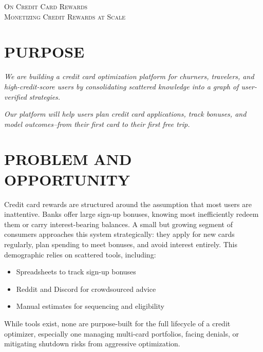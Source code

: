\begin{center}
    \textsc{\huge On Credit Card Rewards}\\[0.1cm]
    \textsc{Monetizing Credit Rewards at Scale}\\[1em]
\end{center}

\section{PURPOSE}
\textit{We are building a credit card optimization platform for churners, travelers, and high-credit-score users by consolidating scattered knowledge into a graph of user-verified strategies.}

\textit{Our platform will help users plan credit card applications, track bonuses, and model outcomes--from their first card to their first free trip.}

\vspace{0.5em}
\section{PROBLEM AND OPPORTUNITY}
Credit card rewards are structured around the assumption that most users are inattentive. Banks offer large sign-up bonuses, knowing most inefficiently redeem them or carry interest-bearing balances. A small but growing segment of consumers approaches this system strategically: they apply for new cards regularly, plan spending to meet bonuses, and avoid interest entirely. This demographic relies on scattered tools, including:
\vspace{-0.5em}
\begin{itemize}[noitemsep]
    \item Spreadsheets to track sign-up bonuses
    \item Reddit and Discord for crowdsourced advice
    \item Manual estimates for sequencing and eligibility
\end{itemize}
\vspace{-0.5em}
While tools exist, none are purpose-built for the full lifecycle of a credit optimizer, especially one managing multi-card portfolios, facing denials, or mitigating shutdown risks from aggressive optimization.

\vspace{0.5em}
